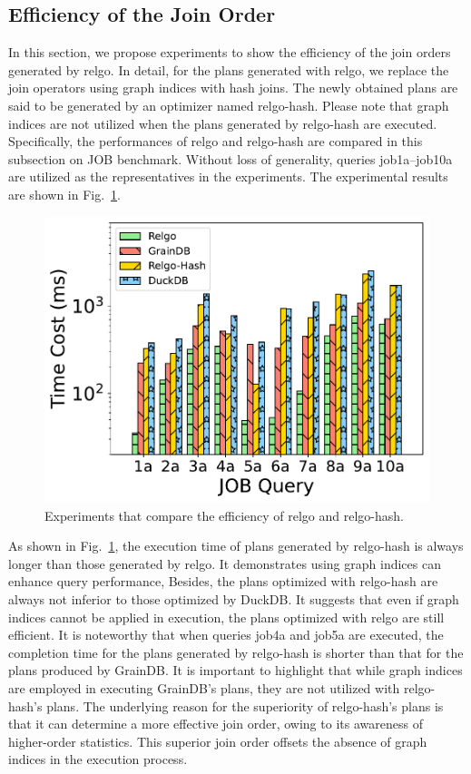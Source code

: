 \subsection{Efficiency of the Join Order}
\label{sec:experiment-efficiency-of-plans}

In this section, we propose experiments to show the efficiency of the join orders generated by relgo.
In detail, for the plans generated with relgo, we replace the join operators using graph indices with hash joins.
The newly obtained plans are said to be generated by an optimizer named relgo-hash.
Please note that graph indices are not utilized when the plans generated by relgo-hash are executed.
Specifically, the performances of relgo and relgo-hash are compared in this subsection on JOB benchmark.
Without loss of generality, queries job1a--job10a are utilized as the representatives in the experiments.
The experimental results are shown in Fig.~\ref{fig:exp-hash-plan}.

\begin{figure}[ht]
    \centering
    \includegraphics[width=.9\linewidth]{./figures/exp/hash_plan_job.pdf}
    \caption{Experiments that compare the efficiency of relgo and relgo-hash.}
    \label{fig:exp-hash-plan}
\end{figure}

As shown in Fig.~\ref{fig:exp-hash-plan}, the execution time of plans generated by relgo-hash is always longer than those generated by relgo.
It demonstrates using graph indices can enhance query performance,
Besides, the plans optimized with relgo-hash are always not inferior to those optimized by DuckDB.
It suggests that even if graph indices cannot be applied in execution, the plans optimized with relgo are still efficient.
It is noteworthy that when queries job4a and job5a are executed, the completion time for the plans generated by relgo-hash is shorter than that for the plans produced by GrainDB. 
It is important to highlight that while graph indices are employed in executing GrainDB's plans, they are not utilized with relgo-hash's plans. The underlying reason for the superiority of relgo-hash's plans is that it can determine a more effective join order, owing to its awareness of higher-order statistics. 
This superior join order offsets the absence of graph indices in the execution process.